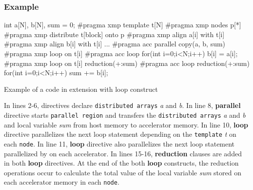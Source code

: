\subsubsection*{Example}
\begin{myfigure}
\begin{minipage}{0.45\hsize}
\begin{center}
\end{center}
\end{minipage}
%
\begin{minipage}{0.53\hsize}
\begin{center}
\begin{XACCCexampleR}
int a[N], b[N], sum = 0;
#pragma xmp template t[N]
#pragma xmp nodes p[*]
#pragma xmp distribute t[block] onto p
#pragma xmp align a[i] with t[i]
#pragma xmp align b[i] with t[i]
...
#pragma acc parallel copy(a, b, sum)
{
#pragma xmp loop on t[i]
#pragma acc loop
  for(int i=0;i<N;i++){
    b[i] = a[i];
  }
#pragma xmp loop on t[i] reduction(+:sum)
#pragma acc loop reduction(+:sum)
  for(int i=0;i<N;i++){
    sum += b[i];
  }
}
\end{XACCCexampleR}
\end{center}
\end{minipage}
\caption{Example of a code in {\XMP} extension with {\OACC} loop construct}\label{code:ex-oacc-loop}
\end{myfigure}

In lines 2-6,
{\XMP} directives declare {\tt distributed arrays} {\it a} and {\it b}.
In line 8,
{\OACC} {\bf parallel} directive starts {\tt parallel region} and transfers the {\tt distributed arrays} {\it a} and {\it b} and local variable {\it sum} from host memory to accelerator memory.
In line 10,
{\XMP} {\bf loop} directive parallelizes the next loop statement depending on the {\tt template} {\it t} on each {\tt node}.
In line 11,
{\OACC} {\bf loop} directive also parallelizes the next loop statement parallelized by {\XMP} on each accelerator.
In lines 15-16, 
{\bf reduction} clauses are added in both {\bf loop} directives.
At the end of the both {\bf loop} constructs, 
the reduction operations occur to calculate 
the total value of the local variable {\it sum} stored on each accelerator memory in each {\tt node}.

